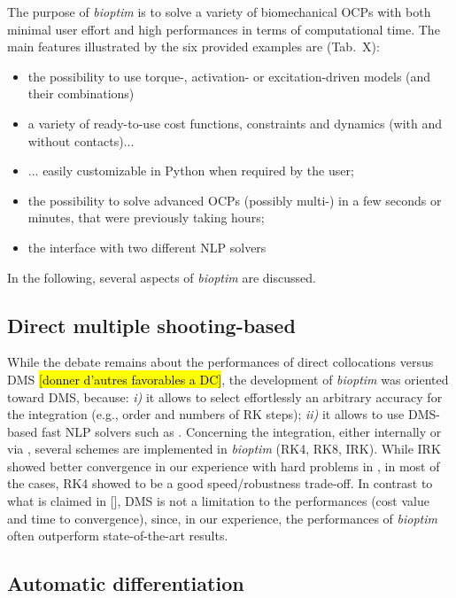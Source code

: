 The purpose of \textit{bioptim} is to solve a variety of biomechanical OCPs with both minimal user effort and high performances in terms of computational time. 
The main features illustrated by the six provided examples are (Tab.~X): 
\begin{itemize}
\item the possibility to use torque-, activation- or excitation-driven models (and their combinations)
\item a variety of ready-to-use cost functions, constraints and dynamics (with and without contacts)...
\item ... easily customizable in Python when required by the user;
\item the possibility to solve advanced OCPs (possibly multi-) in a few seconds or minutes, that were previously taking hours;
\item the interface with two different NLP solvers
\end{itemize}
In the following, several aspects of \textit{bioptim} are discussed.


\subsection{Direct multiple shooting-based}

While the debate remains about the performances of direct collocations versus DMS \cite{diehl2006fast}\hl{[donner d'autres favorables a DC]}, the development of \textit{bioptim} was oriented toward DMS, because: \textit{i)} it allows to select effortlessly an arbitrary accuracy for the integration (e.g., order and numbers of RK steps); \textit{ii)} it allows to use DMS-based fast NLP solvers such as \acados.
Concerning the integration, either internally or via \acados, several schemes are implemented in \textit{bioptim} (RK4, RK8, IRK).
While IRK showed better convergence in our experience with hard problems in \acados, in most of the cases, RK4 showed to be a good speed/robustness trade-off. 
In contrast to what is claimed in [\addref], DMS is not a limitation to the performances (cost value and time to convergence), since, in our experience, the performances of \textit{bioptim} often outperform state-of-the-art results.

\subsection{Automatic differentiation}

